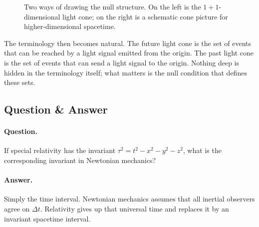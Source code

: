 \begin{figure}[t]
\centering
{}
\hspace{1cm}
\caption{Two ways of drawing the null structure. On the left is the \(1+1\)-dimensional light cone; on the right is a schematic cone picture for higher-dimensional spacetime.}
\end{figure}

The terminology then becomes natural. The future light cone is the set of events that can be reached by a light signal emitted from the origin. The past light cone is the set of events that can send a light signal to the origin. Nothing deep is hidden in the terminology itself; what matters is the null condition that defines these sets.

\subsection{Question \& Answer}

\paragraph{Question.} If special relativity has the invariant \(\tau^2=t^2-x^2-y^2-z^2\), what is the corresponding invariant in Newtonian mechanics?

\paragraph{Answer.} Simply the time interval. Newtonian mechanics assumes that all inertial observers agree on \(\Delta t\). Relativity gives up that universal time and replaces it by an invariant spacetime interval.

